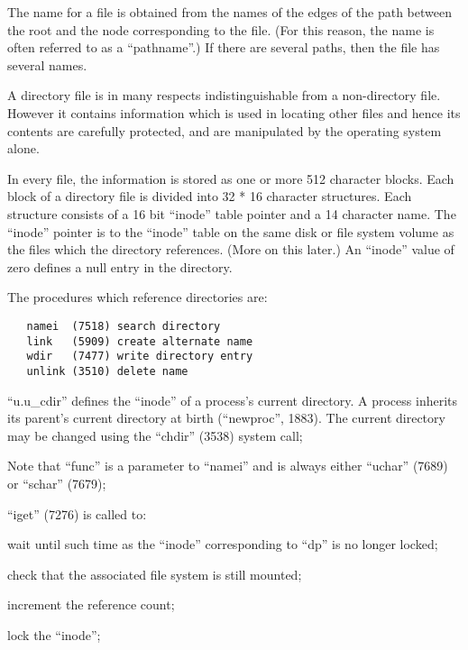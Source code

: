 The name for a file  is  obtained  from
the  names  of  the  edges  of the path
between   the   root   and   the   node
corresponding  to  the file.  (For this
reason, the name is often  referred  to
as  a ``pathname''.) If there are several
paths, then the file has several names.



A directory file is  in  many  respects
indistinguishable  from a non-directory
file.  However it contains  information
which  is  used in locating other files
and hence its  contents  are  carefully
protected,  and  are manipulated by the
operating system alone.


In  every  file,  the  information   is
stored  as  one  or  more 512 character
blocks.  Each block of a directory file
is  divided  into  32  *  16  character
structures.  Each structure consists of
a 16 bit ``inode'' table pointer and a 14
character name.  The ``inode'' pointer is
to  the  ``inode'' table on the same disk
or file  system  volume  as  the  files
which  the  directory references. (More
on this later.)  An  ``inode''  value  of
zero defines a null entry in the directory.

The procedures which  reference  directories are:

\begin{verbatim}
   namei  (7518) search directory
   link   (5909) create alternate name
   wdir   (7477) write directory entry
   unlink (3510) delete name
\end{verbatim}


\bd
\item[7531:] ``u.u\_cdir'' defines the ``inode'' of
      a process's current directory.  A
      process  inherits  its   parent's
      current    directory   at   birth
      (``newproc'', 1883).   The  current
      directory  may  be  changed using
      the ``chdir'' (3538) system call;
\item[7532:] Note that ``func'' is  a  parameter
      to  ``namei''  and is always either
      ``uchar'' (7689) or ``schar'' (7679);
\item[7534:] ``iget'' (7276) is called to:
\bi
\item wait  until  such  time  as   the
``inode''  corresponding to ``dp'' is
no longer locked;

\item check that  the  associated  file system is still mounted;
\item increment the reference count;
\item lock the ``inode'';
\ei

